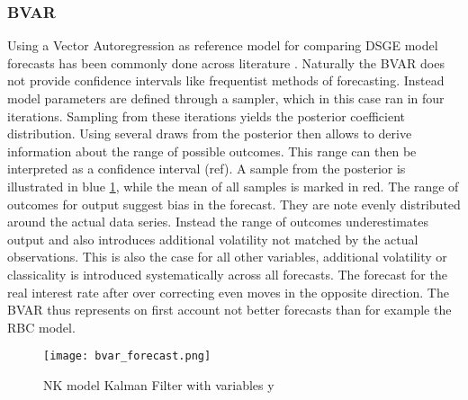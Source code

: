 \documentclass[12pt,a4paper,english]{article} %
\begin{document}
	\subsubsection{BVAR}
	Using a Vector Autoregression as reference model for comparing DSGE model forecasts has been commonly done across literature \cite{schorfheide_loss_2000, chin_bayesian_2019}. 
	Naturally the BVAR does not provide confidence intervals like frequentist methods of forecasting. Instead model parameters are defined through a sampler, which in this case ran in four iterations. Sampling from these iterations yields the posterior coefficient distribution. Using several draws from the posterior then allows to derive information about the range of possible outcomes. This range can then be interpreted as a confidence interval (ref).  
	A sample from the posterior is illustrated in blue \ref{fig:bvar}, while the mean of all samples is marked in red. The range of outcomes for output suggest bias in the forecast. They are note evenly distributed around the actual data series. Instead the range of outcomes underestimates output and also introduces additional volatility not matched by the actual observations. This is also the case for all other variables, additional volatility or classicality is introduced systematically across all forecasts. The forecast for the real interest rate after over correcting even moves in the opposite direction. 
	The BVAR thus represents on first account not better forecasts than for example the RBC model.
	\begin{figure}[H]
		\begin{center}
			\texttt{[image: bvar\_forecast.png]}
			\caption{NK model Kalman Filter with variables y}\label{fig:bvar}
		\end{center}
	\end{figure}
	
\end{document}
